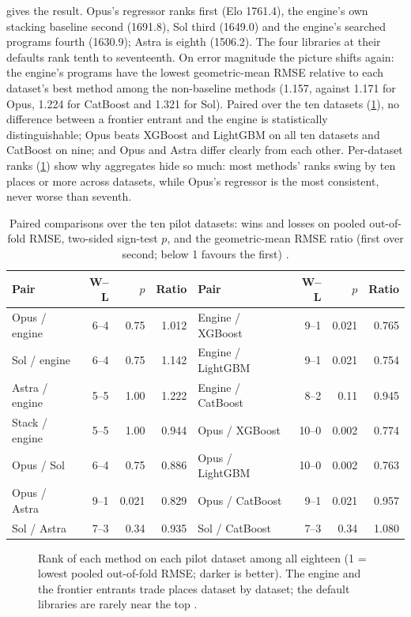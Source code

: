  gives the result. Opus's regressor ranks first (Elo 1761.4), the engine's own
stacking baseline second (1691.8), Sol third (1649.0) and the engine's searched programs fourth
(1630.9); Astra is eighth (1506.2). The four libraries at their defaults rank tenth to seventeenth.
On error magnitude the picture shifts again: the engine's programs have the lowest geometric-mean
RMSE relative to each dataset's best method among the non-baseline methods (1.157, against 1.171 for
Opus, 1.224 for CatBoost and 1.321 for Sol). Paired over the ten datasets (\cref{tab:pairs}), no
difference between a frontier entrant and the engine is statistically distinguishable; Opus beats
XGBoost and LightGBM on all ten datasets and CatBoost on nine; and Opus and Astra differ clearly
from each other. Per-dataset ranks (\cref{fig:heatmap}) show why aggregates hide so much: most
methods' ranks swing by ten places or more across datasets, while Opus's regressor is the most
consistent, never worse than seventh.

\begin{table}[t]
\caption{Paired comparisons over the ten pilot datasets: wins and losses on pooled out-of-fold RMSE,
two-sided sign-test $p$, and the geometric-mean RMSE ratio (first over second; below 1 favours the
first) \pre.}
\label{tab:pairs}
\centering\sffamily\footnotesize\lining
\begin{tabular}{@{}lrrr@{\qquad}lrrr@{}}
\toprule
Pair & W--L & $p$ & Ratio & Pair & W--L & $p$ & Ratio \\
\midrule
Opus / engine & 6--4 & 0.75 & 1.012 & Engine / XGBoost & 9--1 & 0.021 & 0.765 \\
Sol / engine & 6--4 & 0.75 & 1.142 & Engine / LightGBM & 9--1 & 0.021 & 0.754 \\
Astra / engine & 5--5 & 1.00 & 1.222 & Engine / CatBoost & 8--2 & 0.11 & 0.945 \\
Stack / engine & 5--5 & 1.00 & 0.944 & Opus / XGBoost & 10--0 & 0.002 & 0.774 \\
Opus / Sol & 6--4 & 0.75 & 0.886 & Opus / LightGBM & 10--0 & 0.002 & 0.763 \\
Opus / Astra & 9--1 & 0.021 & 0.829 & Opus / CatBoost & 9--1 & 0.021 & 0.957 \\
Sol / Astra & 7--3 & 0.34 & 0.935 & Sol / CatBoost & 7--3 & 0.34 & 1.080 \\
\bottomrule
\end{tabular}
\end{table}

\begin{figure}[t]
\centering

\caption{Rank of each method on each pilot dataset among all eighteen (1 = lowest pooled
out-of-fold RMSE; darker is better). The engine and the frontier entrants trade places dataset by
dataset; the default libraries are rarely near the top \pre.}
\label{fig:heatmap}
\end{figure}

